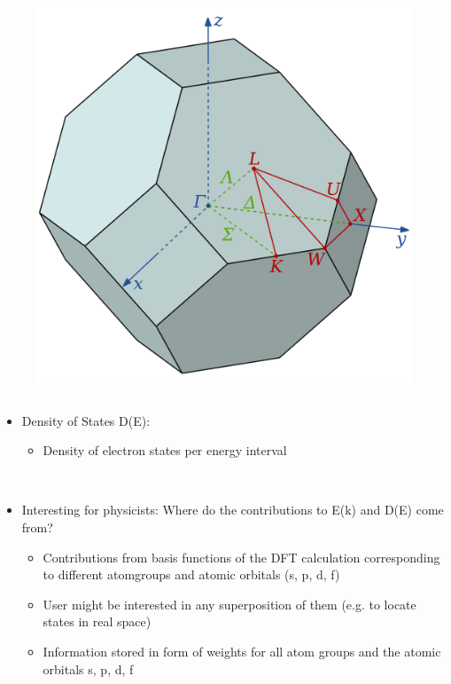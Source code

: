 \begin{frame}
\begin{column}{.5\textwidth}
    \end{column}
    \begin{column}{.5\textwidth}
        \begin{figure}
            \includegraphics[width=0.7\linewidth]{fig/Brillouin_Zone_(1st,_FCC).png}
        \end{figure}

    \end{column}

\end{frame}

\begin{frame}
    \begin{itemize}
    \item Density of States D(E):
        \begin{itemize}
        \item Density of electron states per energy interval %
        \end{itemize}

        \
    \item Interesting for physicists: Where do the contributions to E(k) and D(E) come from?
        \begin{itemize}
        \item Contributions from basis functions of the DFT calculation corresponding to different atomgroups and atomic orbitals (s, p, d, f)
        \item User might be interested in any superposition of them (e.g. to locate states in real space)
        \item Information stored in form of weights for all atom groups and the atomic orbitals s, p, d, f 
        \end{itemize}

    \end{itemize}
\end{frame}